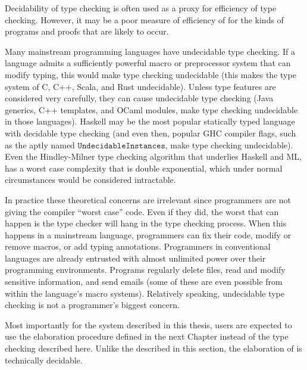Decidability of type checking is often used as a proxy for efficiency of type checking.
However, it may be a poor measure of efficiency of for the kinds of programs and proofs that are likely to occur.
 

Many mainstream programming languages have undecidable type checking.
If a language admits a sufficiently powerful macro or preprocessor system that can modify typing, this would make type checking undecidable (this makes the type system of C, C++, Scala, and Rust undecidable).
Unless type features are considered very carefully, they can cause undecidable type checking (Java generics\cite{10.1145/3093333.3009871}, C++ templates\cite{veldhuizen2003}, and OCaml modules\cite{Rossberg1999OCaml}, make type checking undecidable in those languages).
Haskell may be the most popular statically typed language with decidable type checking (and even then, popular GHC compiler flags, such as the aptly named $\mathtt{UndecidableInstances}$, make type checking undecidable).
Even the Hindley-Milner type checking algorithm that underlies Haskell and ML, has a worst case complexity that is double exponential, which under normal circumstances would be considered intractable.
 
In practice these theoretical concerns are irrelevant since programmers are not giving the compiler ``worst case'' code.
Even if they did, the worst that can happen is the type checker will hang in the type checking process.
When this happens in a mainstream language, programmers can fix their code, modify or remove macros, or add typing annotations.
Programmers in conventional languages are already entrusted with almost unlimited power over their programming environments.
Programs regularly delete files, read and modify sensitive information, and send emails (some of these are even possible from within the language's macro systems).
Relatively speaking, undecidable type checking is not a programmer's biggest concern.
 
Most importantly for the system described in this thesis, users are expected to use the elaboration procedure defined in the next Chapter instead of the \bidir{} type checking described here.
Unlike the \bidir{} described in this section, the elaboration of  is technically decidable.

